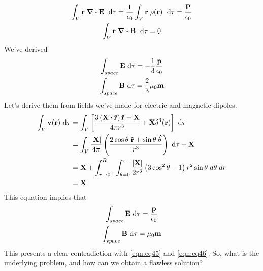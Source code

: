 \documentclass{article}
\numberwithin{equation}{section}
\begin{document}
\begin{gather}
\int_V \vb{r}\;\div\vb{E}\;\ \dd\tau=\frac{1}{\epsilon_0} \int_V \vb{r}\;\rho(\vb{r})\; \ \dd\tau=\frac{\vb{P}}{\epsilon_0}\nonumber\\\int_V \vb{r}\;\div\vb{B}\;\ \dd\tau=0\nonumber
\end{gather}
We've derived
\begin{gather}
\int_{space} \vb{E} \ \dd\tau = -\frac{1}{3} \frac{\vb{p}}{\epsilon_0}\label{eqn:eq45}\\\int_{space} \vb{B} \ \dd\tau = \frac{2}{3} \mu_0\vb{m}\label{eqn:eq46}
\end{gather}
Let's derive them from fields we've made for electric and magnetic dipoles.
\begin{align}
\int_V \vb{v}(\vb{r}) \ \dd\tau&=\int_V\left[\frac{3\left( \vb{X}\vdot\vu{r}\right) \vu{r}-\vb{X}}{4\pi r^3}+\vb{X}\delta^3(\vb{r})\right] \ \dd\tau\nonumber\\&=\int_V \frac{|\vb{X}|}{4\pi} \left( \frac{2\cos\theta\;\vu{r}+\sin\theta\;\vu{\theta}}{r^3}\right) \ \dd\tau+\vb{X}\nonumber\\&=\vb{X}+\int_{r\rightarrow0^+}^R\int_{\theta=0}^\pi \frac{|\vb{X}|}{2r^3}\left(3\cos^2\theta-1\right)r^2 \sin\theta\;d\theta\;dr\nonumber\\&=\vb{X}\nonumber
\end{align}
This equation implies that
\begin{gather}
\int_{space} \vb{E} \ \dd\tau = \frac{\vb{p}}{\epsilon_0}\label{eqn:eq48}\\\int_{space} \vb{B} \ \dd\tau = \mu_0\vb{m}\label{eqn:eq49}
\end{gather}
This presents a clear contradiction with \eqref{eqn:eq45} and \eqref{eqn:eq46}. So, what is the underlying problem, and how can we obtain a flawless solution?
\end{document}
